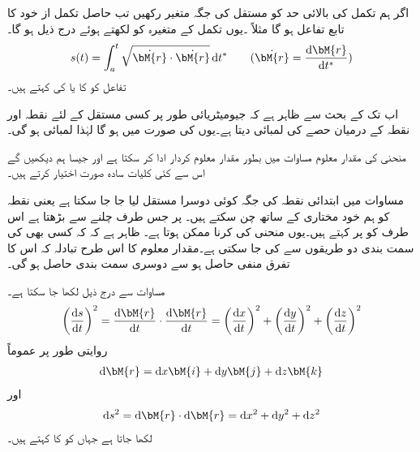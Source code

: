 اگر ہم تکمل کی بالائی حد کو مستقل  کی جگہ متغیر  رکھیں تب حاصل تکمل از خود  کا تابع تفاعل ہو گا مثلاً ۔یوں تکمل کے متغیرہ کو  لکھتے ہوئے درج ذیل ہو گا۔
\begin{align}\label{مساوات_الاحصاء_لمبائی_منحنی_ب}
s(t)=\int_a^t \sqrt{\dot{\bM{r}}\cdot \dot{\bM{r}}}\dif t^* \quad \quad (\dot{\bM{r}}=\frac{\dif \bM{r}}{\dif t^*})
\end{align}
تفاعل  کو  کا  یا  کی  کہتے ہیں۔  

اب تک کے بحث سے ظاہر ہے کہ جیومیٹریائی طور پر  کسی مستقل  کے لئے  نقطہ  اور نقطہ  کے درمیان حصے کی لمبائی دیتا ہے۔یوں  کی صورت میں  ہو گا لہٰذا لمبائی  ہو گی۔

منحنی کی مقدار معلوم مساوات میں  بطور مقدار معلوم کردار ادا کر سکتا ہے  اور جیسا ہم دیکھیں گے اس سے کئی کلیات سادہ صورت اختیار کرتے ہیں۔

مساوات  میں ابتدائی نقطہ  کی جگہ  کوئی دوسرا مستقل لیا جا جا سکتا ہے یعنی نقطہ  کو  ہم خود مختاری کے ساتھ چن سکتے ہیں۔ پر جس طرف چلنے سے  بڑھتا ہے اس  طرف کو  پر  کہتے ہیں۔یوں منحنی کی  کرنا ممکن ہوتا ہے۔ ظاہر ہے کہ کہ کسی بھی  کی سمت بندی دو طریقوں سے کی جا سکتی ہے۔مقدار معلوم کا اس طرح تبادلہ کہ اس کا تفرق منفی حاصل ہو سے  دوسری سمت بندی حاصل ہو گی۔

مساوات  سے درج ذیل لکھا جا سکتا ہے۔
\begin{align}\label{مساوات_الاحصاء_لمبائی_قوس_تفرق}
\left(\frac{\dif s}{\dif t}\right)^2=\frac{\dif \bM{r}}{\dif t}\cdot \frac{\dif \bM{r}}{\dif t}=\left(\frac{\dif x}{\dif t}\right)^2+\left(\frac{\dif y}{\dif t}\right)^2+\left(\frac{\dif z}{\dif t}\right)^2
\end{align}
روایتی طور پر عموماً
\begin{align*}
\dif \bM{r}=\dif x\bM{i}+\dif y\bM{j}+\dif z\bM{k}
\end{align*}
اور
\begin{align}\label{مساوات_الاحصاء_لمبائی_قوس_چھوٹا_حصہ}
\dif s^2=\dif \bM{r}\cdot \dif \bM{r}=\dif x^2+\dif y^2+\dif z^2
\end{align}
لکھا جاتا ہے جہاں  کو  کا  کہتے ہیں۔

